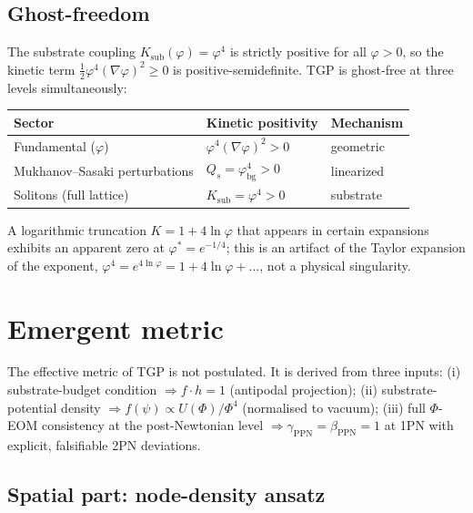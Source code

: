 \documentclass[11pt,a4paper]{article}
\renewcommand{\Phi}{\varPhi}
\begin{document}
\subsection{Ghost-freedom}\label{ssec:ghost}

The substrate coupling $K_{\mathrm{sub}}(\varphi)=\varphi^{4}$ is
strictly positive for all $\varphi>0$, so the kinetic term
$\tfrac{1}{2}\varphi^{4}(\nabla\varphi)^{2}\geq 0$ is positive-semidefinite.
TGP is ghost-free at three levels simultaneously:

\begin{center}\small
\begin{tabular}{@{}lll@{}}
\toprule
\textbf{Sector} & \textbf{Kinetic positivity} & \textbf{Mechanism}\\
\midrule
Fundamental ($\varphi$) & $\varphi^{4}(\nabla\varphi)^{2}>0$ & geometric\\
Mukhanov--Sasaki perturbations & $Q_{s}=\varphi_{\mathrm{bg}}^{4}>0$ & linearized\\
Solitons (full lattice) & $K_{\mathrm{sub}}=\varphi^{4}>0$ & substrate\\
\bottomrule
\end{tabular}
\end{center}

A logarithmic truncation $K=1+4\ln\varphi$ that appears in certain
expansions exhibits an apparent zero at $\varphi^{\ast}=e^{-1/4}$; this
is an artifact of the Taylor expansion of the exponent,
$\varphi^{4}=e^{4\ln\varphi}=1+4\ln\varphi+\dots$, not a physical
singularity.

\section{Emergent metric}\label{sec:metric}

The effective metric of TGP is not postulated. It is derived from three
inputs:
(i) substrate-budget condition $\Rightarrow f\cdot h=1$ (antipodal projection);
(ii) substrate-potential density $\Rightarrow f(\psi)\propto U(\Phi)/\Phi^{4}$
(normalised to vacuum);
(iii) full $\Phi$-EOM consistency at the post-Newtonian level
$\Rightarrow \gamma_{\mathrm{PPN}}=\beta_{\mathrm{PPN}}=1$ at 1PN with
explicit, falsifiable 2PN deviations.

\subsection{Spatial part: node-density ansatz}
\end{document}
